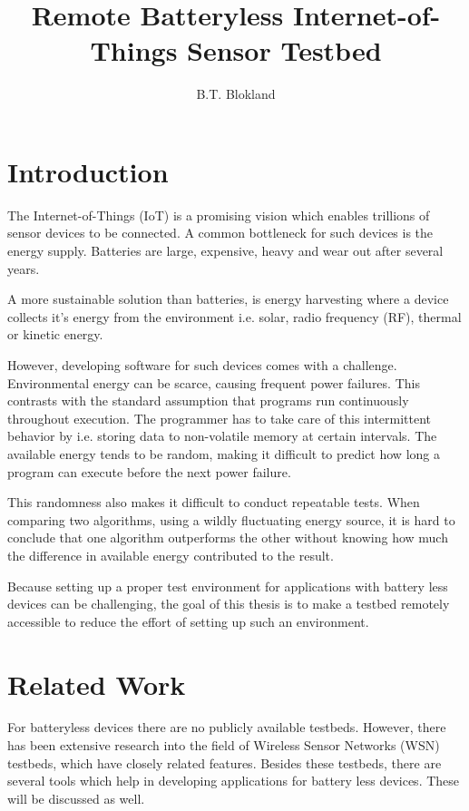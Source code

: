 \documentclass[]{article}
\title{Remote Batteryless Internet-of-Things Sensor Testbed}
\author{B.T. Blokland}
\begin{document}
\maketitle

\section{Introduction}

The Internet-of-Things (IoT) is a promising vision which enables trillions of sensor devices to be connected. A common bottleneck for such devices is the energy supply. Batteries are large, expensive, heavy and wear out after several years.

A more sustainable solution than batteries, is energy harvesting where a device collects it's energy from the environment i.e. solar, radio frequency (RF), thermal or kinetic energy.

However, developing software for such devices comes with a challenge. Environmental energy can be scarce, causing frequent power failures. This contrasts with the standard assumption that programs run continuously throughout execution. The programmer has to take care of this intermittent behavior by i.e. storing data to non-volatile memory at certain intervals. The available energy tends to be random, making it difficult to predict how long a program can execute before the next power failure. 

This randomness also makes it difficult to conduct repeatable tests. When comparing two algorithms, using a wildly fluctuating energy source, it is hard to conclude that one algorithm outperforms the other without knowing how much the difference in available energy contributed to the result.

Because setting up a proper test environment for applications with battery less devices can be challenging, the goal of this thesis is to make a testbed remotely accessible to reduce the effort of setting up such an environment. 
 
\section{Related Work}

For batteryless devices there are no publicly available testbeds. However, there has been extensive research into the field of Wireless Sensor Networks (WSN) testbeds, which have closely related features. Besides these testbeds, there are several tools which help in developing applications for battery less devices. These will be discussed as well.
\end{document}
